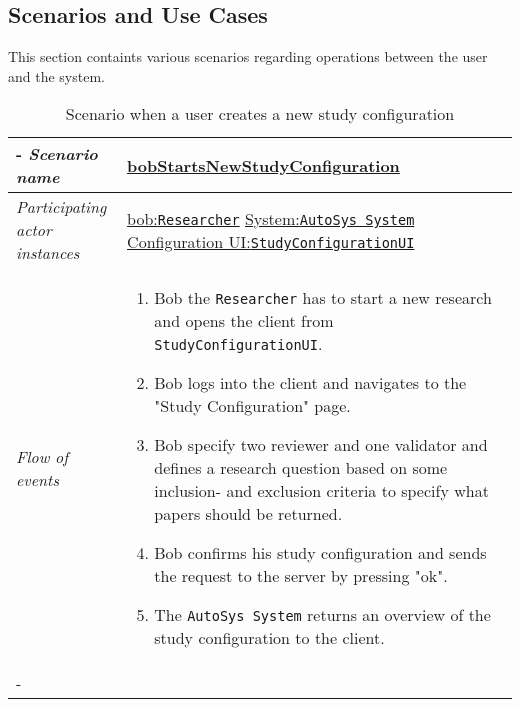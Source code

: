 

\subsection{Scenarios and Use Cases}
%
%
\newcommand{\researcher}{\texttt{Researcher}\xspace}
\newcommand{\configUI}{\texttt{StudyConfigurationUI}\xspace}
\newcommand{\invalidUser}{\texttt{InvalidUser}\xspace}
\newcommand{\system}{\texttt{AutoSys System}\xspace}
\newcommand{\serverside}{\texttt{Study Configuration Server}\xspace}
\newcommand{\clientside}{\texttt{Study Review UI}\xspace}
\newcommand{\incident}{\texttt{Incident}\xspace}
\newcommand{\reportemergency}{\texttt{ReportEmergency}\xspace}
\newcommand{\openincident}{\texttt{OpenIncident}\xspace}


This section containts various scenarios regarding operations between the user and the system.
%
%
\begin{table}[h!]
\tabulinesep=1.5mm
\begin{tabu} to 
	\tabucline[1.5pt]-
	\textit{Scenario name} & \underline{bobStartsNewStudyConfiguration} \\
	\hline
	\textit{Participating actor \newline instances} & \underline{bob:\researcher} \newline \underline{System:\system}
	\newline \underline{Configuration UI:\configUI} \\
	\hline
	\textit{Flow of events} &
	\vspace{-3mm}
	\begin{enumerate}[leftmargin=*,topsep=0pt,itemsep=-1ex]
		\item Bob the \researcher has to start a new research  and opens the client from \configUI. 
		\item Bob logs into the client and navigates to the "Study Configuration" page. 
		
		\item Bob specify two reviewer and one validator and defines a research question based on some inclusion- and exclusion criteria to specify what papers should be returned. 
		
		\item Bob confirms his study configuration and sends the request to the server by pressing "ok".

		\item The \system returns an overview of the study configuration to the client.
	\end{enumerate} \\
	\tabucline[1.5pt]-
\end{tabu}
\caption{Scenario when a user creates a new study configuration}
\label{sc:bobStartsNewStudyConfiguration}
\end{table}


